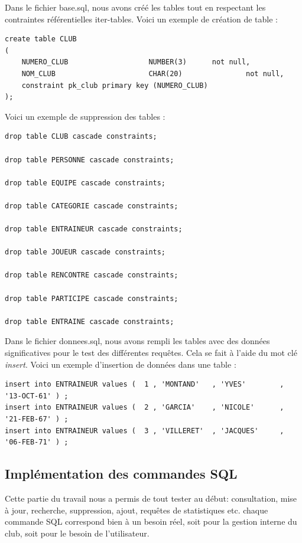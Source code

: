 \documentclass{article}
\begin{document}
Dans le fichier base.sql, nous avons créé les tables tout en respectant les contraintes référentielles iter-tables. Voici un exemple de création de table :  \\

\begin{verbatim}
create table CLUB
(
    NUMERO_CLUB                   NUMBER(3)		 not null,
    NOM_CLUB                      CHAR(20)               not null,	 
    constraint pk_club primary key (NUMERO_CLUB)
); 

\end{verbatim}


Voici un exemple de suppression des tables : \\

\begin{verbatim}
drop table CLUB cascade constraints;

drop table PERSONNE cascade constraints;

drop table EQUIPE cascade constraints;

drop table CATEGORIE cascade constraints;

drop table ENTRAINEUR cascade constraints;

drop table JOUEUR cascade constraints;

drop table RENCONTRE cascade constraints;

drop table PARTICIPE cascade constraints;

drop table ENTRAINE cascade constraints;
\end{verbatim}

Dans le fichier donnees.sql, nous avons rempli les tables avec des données significatives pour le test des différentes requêtes. Cela se fait à l'aide du mot clé \emph{insert}. 
Voici un exemple d'insertion de données dans une table : \\

\begin{verbatim}
insert into ENTRAINEUR values (  1 , 'MONTAND'   , 'YVES'        , '13-OCT-61' ) ;
insert into ENTRAINEUR values (  2 , 'GARCIA'    , 'NICOLE'      , '21-FEB-67' ) ;
insert into ENTRAINEUR values (  3 , 'VILLERET'  , 'JACQUES'     , '06-FEB-71' ) ;
\end{verbatim}

\subsection{Implémentation des commandes SQL}
Cette partie du travail nous a permis de tout tester au début: consultation, mise à jour, recherche, suppression, ajout, requêtes de statistiques etc. 
chaque commande SQL correspond bien à un besoin réel, soit pour la gestion interne du club, soit pour le besoin de l'utilisateur.
\end{document}
